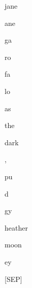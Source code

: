 \documentclass[varwidth=150mm]{standalone}
\begin{document}
\begin{CJK*}{UTF8}{gbsn}
{{{\colorbox{red!1.7827725410461426}{\strut jane}\colorbox{red!1.0990937948226929}{\strut ane} \colorbox{red!7.7465362548828125}{\strut ga}\colorbox{red!2.4621596336364746}{\strut ro}\colorbox{red!6.686114311218262}{\strut fa}\colorbox{red!1.0924679040908813}{\strut lo} \colorbox{red!10.974411010742188}{\strut as} \colorbox{red!4.849059104919434}{\strut the} \colorbox{red!0.0}{\strut dark} \colorbox{red!2.4590225219726562}{\strut ,} \colorbox{red!0.0}{\strut pu}\colorbox{red!1.0495182275772095}{\strut d}\colorbox{red!1.7104802131652832}{\strut gy} \colorbox{red!79.72505187988281}{\strut heather} \colorbox{red!3.3291549682617188}{\strut moon}\colorbox{red!7.152937412261963}{\strut ey} \colorbox{red!1.0030198097229004}{\strut [SEP]}
}}}
\end{CJK*}
\end{document}
